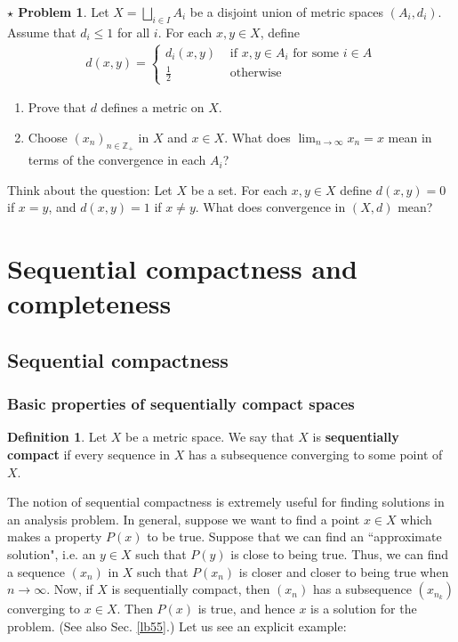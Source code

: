 \documentclass[12pt,b5paper,notitlepage]{article}
\theoremstyle{definition}
\newtheorem{df}{Definition}[section]
\newtheorem{sprob}[prob]{$\star$ Problem}
\theoremstyle{plain}
\newcommand{\Zbb}{\mathbb Z}
\newcommand{\dps}{\displaystyle}
\numberwithin{equation}{section}
\begin{document}
\begin{sprob}
Let $X=\bigsqcup_{i\in I}A_i$ be a disjoint union of metric spaces $(A_i,d_i)$. Assume that $d_i\leq 1$ for all $i$. For each $x,y\in X$, define
\begin{gather*}
d(x,y)=\left\{
\begin{array}{ll}
d_i(x,y)&\text{ if $x,y\in A_i$ for some $i\in A$}\\[0.5ex]
\frac 12&\text{ otherwise}
\end{array}
\right.
\end{gather*}
\begin{enumerate}
\item Prove that $d$ defines a metric on $X$. 
\item Choose $(x_n)_{n\in\Zbb_+}$ in $X$ and $x\in X$. What does $\dps\lim_{n\rightarrow\infty}x_n=x$ mean in terms of the convergence in each $A_i$?
\end{enumerate}
\end{sprob}

Think about the question: Let $X$ be a set. For each $x,y\in X$ define $d(x,y)=0$ if $x=y$, and $d(x,y)=1$ if $x\neq y$. What does convergence in $(X,d)$ mean?



\newpage



\section{Sequential compactness and completeness}



\subsection{Sequential compactness}


\subsubsection{Basic properties of sequentially compact spaces}

\begin{df}
Let $X$ be a metric space. We say that $X$ is \textbf{sequentially compact}  if every sequence in $X$ has a subsequence converging to some point of $X$.
\end{df}





The notion of sequential compactness is extremely useful for finding solutions in an analysis problem. In general, suppose we want to find a point $x\in X$ which makes a property $P(x)$ to be true. Suppose that we can find an ``approximate solution", i.e. an $y\in X$ such that $P(y)$ is close to being true. Thus, we can find a sequence $(x_n)$ in $X$ such that $P(x_n)$ is closer and closer to being true when $n\rightarrow\infty$. Now, if $X$ is sequentially compact, then $(x_n)$ has a subsequence $(x_{n_k})$ converging to $x\in X$. Then $P(x)$ is true, and hence $x$ is a solution for the problem. (See also Sec. \ref{lb55}.) Let us see an explicit example:
\end{document}
